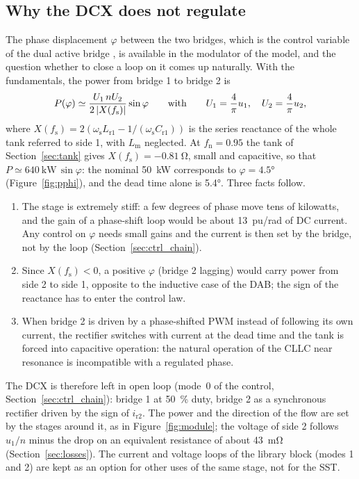 \documentclass[12pt,a4paper]{scrartcl}
\newcommand{\ped}[1]{_{\mathrm{#1}}}
\begin{document}
\begin{onehalfspace}
\subsection{Why the DCX does not regulate}
\label{sec:noreg}

The phase displacement $\varphi$ between the two bridges, which is the control variable of the dual active bridge \cite{dedoncker1991, krismer2010}, is available in the modulator of the model, and the question whether to close a loop on it comes up naturally. With the fundamentals, the power from bridge 1 to bridge 2 is
\begin{equation}
	P(\varphi) \simeq \frac{U\ped{1} \, n U\ped{2}}{2\,\abs{X(f\ped{s})}} \sin\varphi
	\qquad\text{with}\qquad U\ped{1} = \frac{4}{\pi} u\ped{1},\quad U\ped{2} = \frac{4}{\pi} u\ped{2},
	\label{eq:pphi}
\end{equation}
where $X(f\ped{s}) = 2\left(\omega\ped{s} L\ped{r1} - 1/(\omega\ped{s} C\ped{r1})\right)$ is the series reactance of the whole tank referred to side 1, with $L\ped{m}$ neglected. At $f\ped{n} = 0.95$ the tank of Section~\ref{sec:tank} gives $X(f\ped{s}) = \SI{-0.81}{\ohm}$, small and capacitive, so that $P \simeq \SI{640}{\kilo\watt}\,\sin\varphi$: the nominal \SI{50}{\kilo\watt} corresponds to $\varphi = \ang{4.5}$ (Figure~\ref{fig:pphi}), and the dead time alone is \ang{5.4}. Three facts follow.

\begin{enumerate}[nosep]
	\item The stage is extremely stiff: a few degrees of phase move tens of kilowatts, and the gain of a phase-shift loop would be about \SI{13}{pu/rad} of DC current. Any control on $\varphi$ needs small gains and the current is then set by the bridge, not by the loop (Section~\ref{sec:ctrl_chain}).
	\item Since $X(f\ped{s}) < 0$, a positive $\varphi$ (bridge 2 lagging) would carry power from side 2 to side 1, opposite to the inductive case of the DAB; the sign of the reactance has to enter the control law.
	\item When bridge 2 is driven by a phase-shifted PWM instead of following its own current, the rectifier switches with current at the dead time and the tank is forced into capacitive operation: the natural operation of the CLLC near resonance is incompatible with a regulated phase.
\end{enumerate}

\noindent The DCX is therefore left in open loop (mode~0 of the control, Section~\ref{sec:ctrl_chain}): bridge 1 at \SI{50}{\percent} duty, bridge 2 as a synchronous rectifier driven by the sign of $i\ped{r2}$. The power and the direction of the flow are set by the stages around it, as in Figure~\ref{fig:module}; the voltage of side 2 follows $u\ped{1}/n$ minus the drop on an equivalent resistance of about \SI{43}{\milli\ohm} (Section~\ref{sec:losses}). The current and voltage loops of the library block (modes 1 and 2) are kept as an option for other uses of the same stage, not for the SST.


\end{onehalfspace}
\end{document}
